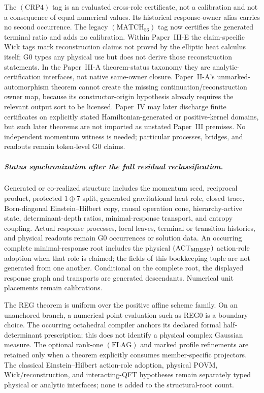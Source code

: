 \documentclass[12pt,a4paper]{article}
\begin{document}
The $(\mathrm{CRP4})$ tag is an evaluated cross-role certificate,
not a calibration and not a consequence of equal numerical values.  Its
historical response-owner alias carries no second occurrence.
The legacy
\((\mathrm{MATCH}_{56})\) tag now certifies the generated terminal ratio and
adds no calibration.  Within Paper~III-E the claim-specific Wick tags mark reconstruction
claims not proved by the elliptic heat calculus itself; G0 types any physical
use but does not derive those reconstruction statements.  In the
Paper~III-A theorem-status taxonomy they are analytic-certification interfaces,
not native same-owner closure.  Paper~II-A's unmarked-automorphism theorem
cannot create the missing continuation/reconstruction owner map, because its
constructor-origin hypothesis already requires the relevant output sort to be
licensed.  Paper~IV may later
discharge finite certificates on explicitly stated Hamiltonian-generated or
positive-kernel domains, but such later theorems are not imported as unstated
Paper~III premises.  No independent momentum witness is needed; particular
processes, bridges, and readouts remain token-level G0 claims.

\subparagraph{Status synchronization after the full residual reclassification.}
Generated or co-realized structure includes the momentum seed, reciprocal
product, protected \(1\oplus7\) split, generated gravitational heat role,
closed trace, Born-diagonal Einstein--Hilbert copy, causal operation cone,
hierarchy-active state, determinant-depth ratios, minimal-response transport,
and entropy coupling.  Actual response processes, local leaves, terminal or
transition histories, and physical readouts remain G0 occurrences or solution
data.  An occurring complete minimal-response root includes the physical
\((\mathrm{ACT}_{\rm MRESP})\) action-role adoption when that role is claimed;
the fields of this bookkeeping tuple are not generated from one another.
Conditional on the complete root, the displayed response graph and transports
are generated descendants.  Numerical unit placements remain calibrations.

The REG theorem is uniform over the positive affine scheme family.  On an unanchored branch, a numerical point evaluation such as REG0 is a
boundary choice. The occurring octahedral compiler anchors its declared
formal half-determinant prescription; this does not identify a physical
complex Gaussian measure.
The optional rank-one \((\mathrm{FLAG})\) and marked profile refinements are
retained only when a theorem explicitly consumes member-specific projectors.
The classical Einstein--Hilbert action-role adoption, physical POVM,
Wick/reconstruction, and interacting-QFT hypotheses remain separately typed
physical or analytic interfaces; none is added to the structural-root count.
\end{document}
